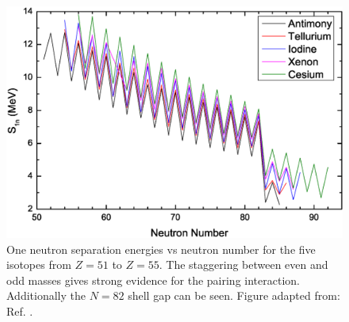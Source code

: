 \begin{figure}[t!]
\centerline{\includegraphics[height=0.3\textheight]{./img/c2/S1n_MassChains.eps}}
	\caption{One neutron separation energies vs neutron number for the five isotopes from $Z=51$ to $Z=55$. The staggering between even and odd masses gives strong evidence for the pairing interaction. Additionally the $N=82$ shell gap can be seen. Figure adapted from: Ref. \cite{nilssonDiagrams}.\label{fig:chp2-s1n-staggering}}
\end{figure}

